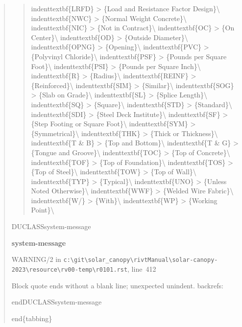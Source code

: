 \documentclass[12pt,notitle,letterpaper]{report}
\newenvironment{DUclass}[1]%
  {%
   \def\DocutilsClassFunctionName{DUCLASS#1}
     \csname \DocutilsClassFunctionName \endcsname}%
  {\csname end\DocutilsClassFunctionName \endcsname}%
\newenvironment{DUadmonition}%
  {\begin{center}
     \begin{lrbox}{\DUadmonitionbox}
       \begin{minipage}{0.9\linewidth}
  }%
  {    \end{minipage}
     \end{lrbox}
     \fbox{\usebox{\DUadmonitionbox}}
   \end{center}
  }
\providecommand*{\DUtitle}[1]{%
  \smallskip\noindent\textbf{#1}\smallskip}
\begin{document}
\begin{quote}
\begin{quote}
indenttextbf\{LRFD\}     >  \{Load and Resistance Factor Design\}\textbackslash{}
indenttextbf\{NWC\}      >  \{Normal Weight Concrete\}\textbackslash{}
indenttextbf\{NIC\}      >  \{Not in Contract\}\textbackslash{}
indenttextbf\{OC\}       >  \{On Center\}\textbackslash{}
indenttextbf\{OD\}       >  \{Outside Diameter\}\textbackslash{}
indenttextbf\{OPNG\}     >  \{Opening\}\textbackslash{}
indenttextbf\{PVC\}      >  \{Polyvinyl Chloride\}\textbackslash{}
indenttextbf\{PSF\}      >  \{Pounds per Square Foot\}\textbackslash{}
indenttextbf\{PSI\}      >  \{Pounds per Square Inch\}\textbackslash{}
indenttextbf\{R\}        >  \{Radius\}\textbackslash{}
indenttextbf\{REINF\}    >  \{Reinforced\}\textbackslash{}
indenttextbf\{SIM\}      >  \{Similar\}\textbackslash{}
indenttextbf\{SOG\}      >  \{Slab on Grade\}\textbackslash{}
indenttextbf\{SL\}       >  \{Splice Length\}\textbackslash{}
indenttextbf\{SQ\}       >  \{Square\}\textbackslash{}
indenttextbf\{STD\}      >  \{Standard\}\textbackslash{}
indenttextbf\{SDI\}      >  \{Steel Deck Institute\}\textbackslash{}
indenttextbf\{SF\}       >  \{Step Footing or Square Foot\}\textbackslash{}
indenttextbf\{SYM\}      >  \{Symmetrical\}\textbackslash{}
indenttextbf\{THK\}      >  \{Thick or Thickness\}\textbackslash{}
indenttextbf\{T \& B\}   >  \{Top and Bottom\}\textbackslash{}
indenttextbf\{T \& G\}   >  \{Tongue and Groove\}\textbackslash{}
indenttextbf\{TOC\}      >  \{Top of Concrete\}\textbackslash{}
indenttextbf\{TOF\}      >  \{Top of Foundation\}\textbackslash{}
indenttextbf\{TOS\}      >  \{Top of Steel\}\textbackslash{}
indenttextbf\{TOW\}      >  \{Top of Wall\}\textbackslash{}
indenttextbf\{TYP\}      >  \{Typical\}\textbackslash{}
indenttextbf\{UNO\}      >  \{Unless Noted Otherwise\}\textbackslash{}
indenttextbf\{WWF\}      >  \{Welded Wire Fabric\}\textbackslash{}
indenttextbf\{W/\}       >  \{With\}\textbackslash{}
indenttextbf\{WP\}       >  \{Working Point\}\textbackslash{}
\end{quote}

\begin{DUclass}{system-message}
\begin{DUadmonition}
\DUtitle{system-message
}

{\color{red}WARNING/2} in \texttt{c:\textbackslash{}git\textbackslash{}solar\_canopy\textbackslash{}rivtManual\textbackslash{}solar-canopy-2023\textbackslash{}resource\textbackslash{}rv00-temp\textbackslash{}r0101.rst}, line~412

Block quote ends without a blank line; unexpected unindent.
backrefs: \end{DUadmonition}
\end{DUclass}

end\{tabbing\}
\end{quote}
\end{document}
